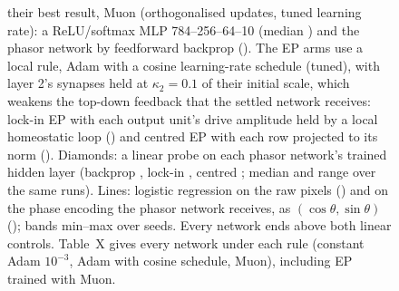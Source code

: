 \begin{figure}[tbp]
{their best result, Muon (orthogonalised updates, tuned learning rate): a ReLU/softmax MLP 784--256--64--10 (median
\FigCRelu) and the phasor network by feedforward backprop (\FigCPhasorbp). The EP arms use a local rule, Adam with a
cosine learning-rate schedule (tuned), with layer 2's synapses held at $\kappa_2=0.1$ of their initial scale, which
weakens the top-down feedback that the settled network receives: lock-in EP with each output unit's drive amplitude
held by a local homeostatic loop (\FigCLockin) and centred EP with each row projected to its norm (\FigCCentred).
Diamonds: a linear probe on each phasor network's trained hidden layer (backprop \FigCProbePhasorbp, lock-in
\FigCProbeLockin, centred \FigCProbeCentred; median and range over the same runs). Lines: logistic regression on the
raw pixels (\FigLRPixels) and on the phase encoding the phasor network receives, as $(\cos\theta,\sin\theta)$
(\FigLRPhase); bands min--max over \FigBaseN{} seeds. Every network ends above both linear controls. Table~X gives every
network under each rule (constant Adam $10^{-3}$, Adam with cosine schedule, Muon), including EP trained with Muon.}
\label{fig:basin}
\end{figure}
